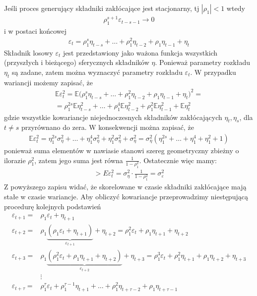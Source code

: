 Jeśli proces generujący składniki zakłócające jest stacjonarny, tj $ |\rho _1|<1 $ wtedy
\begin{gather*}
\rho _1^{s+1}\varepsilon_{t-s-1}\to0 
\end{gather*}
i w postaci końcowej
\begin{gather*}
\varepsilon_t =\rho _1^{s}\eta_{t-s}+\dots +\rho _1^2\eta_{t-2}+\rho _1\eta_{t-1}+\eta_t
\end{gather*}
Składnik losowy $ \varepsilon_t $ jest przedstawiony jako ważona funkcja wszystkich (przyszłych i bieżącego) sferycznych składników $ \eta $. Ponieważ parametry rozkładu $ \eta_t $ są zadane, zatem można wyznaczyć parametry rozkładu $ \varepsilon_t $. W przypadku wariancji możemy zapisać, że
\begin{gather*}
\mathbb E \varepsilon_t^2=
\mathbb E \bigl(
\rho _1^{s}\eta_{t-s}+\dots +\rho _1^2\eta_{t-2}+\rho _1\eta_{t-1}+\eta_t
\bigr)^2
=\\=
\rho_1^{2s}\mathbb E \eta_{t-s}^2+\dots
+
\rho_1^{4}\mathbb E \eta_{t-2}^2+
\rho_1^{2}\mathbb E \eta_{t-1}^2+
\mathbb E \eta_t^2
\end{gather*}
gdzie wszystkie kowariancje niejednoczesnych składników zakłócających $ \eta_t,\eta_s $, dla $ t\neq s $ przyrównano do zera. W konsekwencji można zapisać, że
\begin{gather*}
\mathbb E \varepsilon_t^2=
\eta _1^{2s} \sigma_\eta^2+\dots +\eta _1^4 \sigma_\eta^2+\eta _1^2 \sigma_\eta^2+\sigma_\eta^2
=
\sigma_\eta^2
\left(\eta _1^{2s} +\dots +\eta _1^4 +\eta _1^2 +1\right)
\end{gather*}
ponieważ suma elementów w nawiasie stanowi szereg geometryczny zbieżny o ilorazie $ \rho_1^2 $, zatem jego suma jest równa $ \frac{1}{1-\rho_1^2} $. Ostatecznie więc mamy:
\begin{gather*}
>E\varepsilon_t^2=\sigma_\eta^2 \cdot \frac{1}{1-\rho_1^2}
=
\sigma_\varepsilon^2
\end{gather*}
Z powyższego zapisu widać, że skorelowane w czasie składniki zakłócające mają stałe w czasie wariancje. Aby obliczyć kowariancje przeprowadzimy niestępującą procedurę kolejnych podstawień
\begin{align*}
\varepsilon_{t+1}=&
\rho_1\varepsilon_t+\eta_{t+1}
\\
\varepsilon_{t+2}=&
\rho_1
\underbrace{\left(
\rho_1\varepsilon_t+\eta_{t+1}
\right)}_{\varepsilon_{t+1}}
+\eta_{t+2}
=
\rho_1^2\varepsilon_t+\rho_1\eta_{t+1}+\eta_{t+2}
\\
\varepsilon_{t+3}=&
\rho_1
\underbrace{\left(
\rho_1^2\varepsilon_t+\rho_1\eta_{t+1}+\eta_{t+2}
\right)}_{\varepsilon_{t+2}}
+\eta_{t+3}
=
\rho_1^3\varepsilon_t+\rho_1^2\eta_{t+1}+\rho_1\eta_{t+2}+\eta_{t+3}
\\
&\vdots\\
\varepsilon_{t+\tau}=&
\rho_1^\tau \varepsilon_t+\rho_1^{\tau-1}\eta_{t+1}+\dots+\rho_1^2\eta_{t+\tau-2}+\rho_1\eta_{t+\tau-1}
\\
\end{align*}
